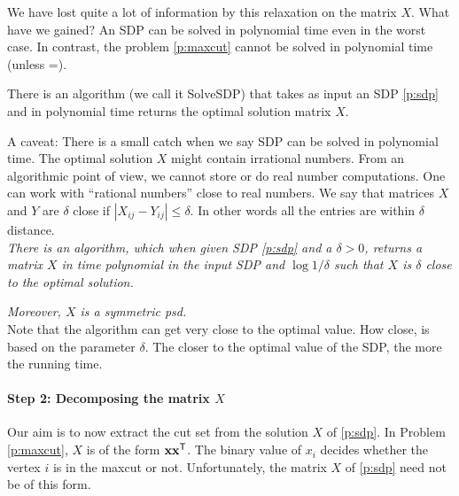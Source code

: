 \documentclass[12pt,
    driverfallback=dvipdfm,
 	openany,
    a4paper,
    toc=bibliography,
    twoside,
    numbers=noenddot]{article}              %
\begin{document}
%
We have lost quite a lot of information by this relaxation on the matrix $X$. What have we gained? An SDP can be solved in polynomial time even in the worst case. In contrast, the problem \ref{p:maxcut} cannot be solved in polynomial time (unless \Ptime=\NP).
\begin{theorem}
\label{thm:sdp}
There is an algorithm (we call it SolveSDP) that takes as input an SDP \ref{p:sdp} and in polynomial time returns the optimal solution matrix $X$.
\end{theorem}
%
\begin{mdframed}[backgroundcolor=light-gray, linecolor=light-gray]
A caveat: There is a small catch when we say SDP can be solved in polynomial time. The optimal solution $X$ might contain irrational numbers. From an algorithmic point of view, we cannot store or do real number computations. One can work with ``rational numbers'' close to real numbers. We say that matrices $X$ and $Y$ are $\delta$ close if $|X_{ij} - Y_{ij}| \leq \delta$. In other words all the entries are within $\delta$ distance. \\

\emph{There is an algorithm, which when given SDP \ref{p:sdp} and a $\delta > 0$, returns a matrix $X$ in time polynomial in the input SDP and $\log 1/\delta$ such that $X$ is $\delta$ close to the optimal solution. }

\emph{Moreover, $X$ is a symmetric psd.}\\

Note that the algorithm can get very close to the optimal value. How close, is based on the parameter $\delta$. The closer to the optimal value of the SDP, the more the running time.
\end{mdframed}

\paragraph*{Step 2: Decomposing the matrix $X$}
Our aim is to now extract the cut set from the solution $X$ of \ref{p:sdp}. In Problem \ref{p:maxcut}, $X$ is of the form $\mathbf x {\mathbf x}^{\mathsf{T}}$. The binary value of $x_i$ decides whether the vertex $i$ is in the maxcut or not. Unfortunately, the matrix $X$ of \ref{p:sdp} need not be of this form. 
%
\end{document}
